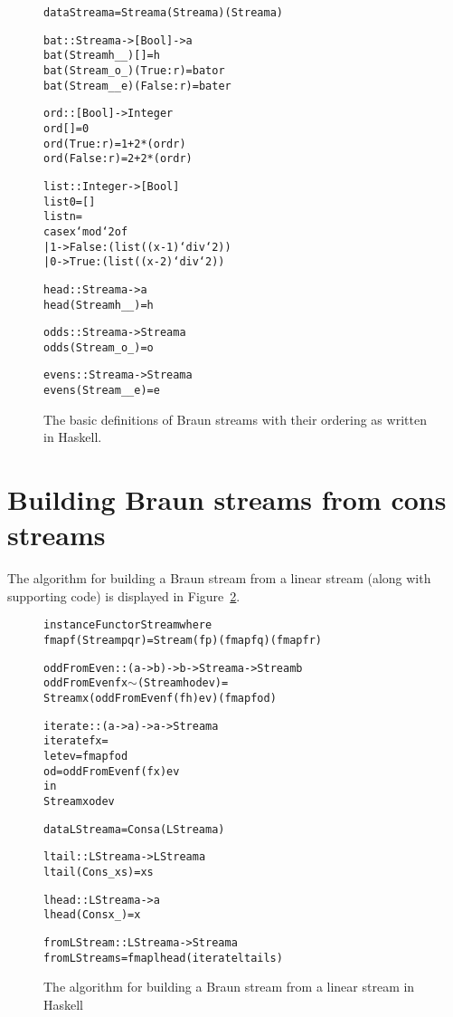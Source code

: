 \documentclass{llncs}
\begin{document}
\begin{figure}
\begin{alltt}
data Stream a = Stream a (Stream a) (Stream a) 

bat :: Stream a -> [Bool] -> a
bat (Stream h _ _) [] = h
bat (Stream _ o _) (True:r) = bat o r
bat (Stream _ _ e) (False:r) = bat e r

ord :: [Bool] -> Integer
ord [] = 0
ord (True:r) = 1 + 2*(ord r)
ord (False:r) = 2 + 2*(ord r)

list :: Integer -> [Bool]
list 0 = []
list n = 
    case x `mod` 2 of
      | 1 -> False:(list ((x-1)`div`2))
      | 0 -> True:(list ((x-2)`div`2))

head :: Stream a -> a
head (Stream h _ _) = h

odds :: Stream a -> Stream a
odds (Stream _ o _) = o

evens :: Stream a -> Stream a
evens (Stream _ _ e) = e
\end{alltt}
\caption{The basic definitions of Braun streams with their ordering as written in Haskell.}
\label{basicCode}
\end{figure}

\section{Building Braun streams from cons streams}

The algorithm for building a Braun stream from a linear stream (along with supporting code) is displayed in Figure~\ref{iterateCode}.

\begin{figure}
\begin{alltt}
instance Functor Stream where
    fmap f (Stream p q r) = Stream (f p) (fmap f q) (fmap f r)

oddFromEven :: (a -> b) -> b -> Stream a -> Stream b
oddFromEven f x  \(\sim\)(Stream h od ev) =
    Stream x (oddFromEven f (f h) ev) (fmap f od)

iterate :: (a -> a) -> a -> Stream a
iterate f x =
    let ev = fmap f od
        od = oddFromEven f (f x) ev
    in
      Stream x od ev

data LStream a = Cons a (LStream a)

ltail :: LStream a -> LStream a
ltail (Cons _ xs) = xs

lhead :: LStream a -> a
lhead (Cons x _) = x

fromLStream :: LStream a -> Stream a
fromLStream s = fmap lhead (iterate ltail s)
\end{alltt}
\caption{The algorithm for building a Braun stream from a linear stream in Haskell}
\label{iterateCode}
\end{figure}
\end{document}
